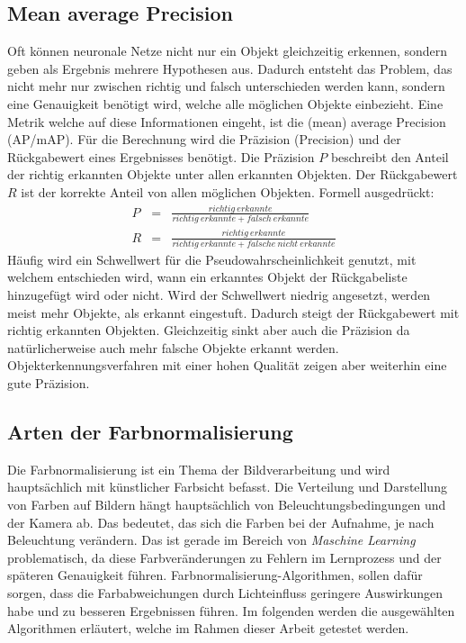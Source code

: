 \documentclass[a4paper,12pt,oneside]{article}
\begin{document}
  \subsection{Mean average Precision}\label{s.map}
Oft können neuronale Netze nicht nur ein Objekt gleichzeitig erkennen, sondern geben als Ergebnis mehrere Hypothesen aus. Dadurch entsteht das Problem, das nicht mehr nur zwischen richtig und falsch unterschieden werden kann, sondern eine Genauigkeit benötigt wird, welche alle möglichen Objekte einbezieht. Eine Metrik welche auf diese Informationen eingeht, ist die (mean) average Precision (AP/mAP). Für die Berechnung wird die Präzision (Precision) und der Rückgabewert eines Ergebnisses benötigt. Die Präzision $P$ beschreibt den Anteil der richtig erkannten Objekte unter allen erkannten Objekten. Der Rückgabewert $R$ ist der korrekte Anteil von allen möglichen Objekten. Formell ausgedrückt:
\begin{eqnarray}
P&=&\frac{richtig\medspace erkannte}{richtig\medspace erkannte + falsch\medspace erkannte}\\
R&=&\frac{richtig\medspace erkannte}{richtig\medspace erkannte + falsche\medspace nicht\medspace erkannte}
\end{eqnarray}
Häufig wird ein Schwellwert für die Pseudowahrscheinlichkeit genutzt, mit welchem entschieden wird, wann ein erkanntes Objekt der Rückgabeliste hinzugefügt wird oder nicht. Wird der Schwellwert niedrig angesetzt, werden meist mehr Objekte, als erkannt eingestuft. Dadurch steigt der Rückgabewert mit richtig erkannten Objekten. Gleichzeitig sinkt aber auch die Präzision da natürlicherweise auch mehr falsche Objekte erkannt werden. Objekterkennungsverfahren mit einer hohen Qualität zeigen aber weiterhin eine gute Präzision.
\subsection{Arten der Farbnormalisierung}\label{s.farbnormalisierungen}
Die Farbnormalisierung ist ein Thema der Bildverarbeitung und wird hauptsächlich mit künstlicher Farbsicht befasst. Die Verteilung und Darstellung von Farben auf Bildern hängt hauptsächlich von Beleuchtungsbedingungen und der Kamera ab. Das bedeutet, das sich die Farben bei der Aufnahme, je nach Beleuchtung verändern. Das ist gerade im Bereich von \textit{Maschine Learning} problematisch, da diese Farbveränderungen zu Fehlern im Lernprozess und der späteren Genauigkeit führen. Farbnormalisierung-Algorithmen, sollen dafür sorgen, dass die Farbabweichungen durch Lichteinfluss geringere Auswirkungen habe und zu besseren Ergebnissen führen. Im folgenden werden die ausgewählten Algorithmen erläutert, welche im Rahmen dieser Arbeit getestet werden.
\end{document}
